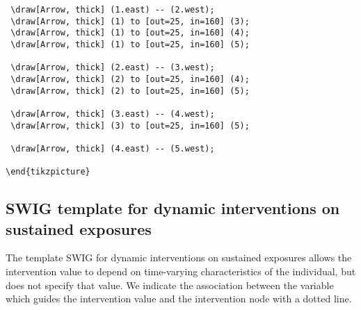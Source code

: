 \documentclass[a4paper]{report}
\begin{document}
\begin{framed}
\begin{Verbatim}
 \draw[Arrow, thick] (1.east) -- (2.west);
 \draw[Arrow, thick] (1) to [out=25, in=160] (3); 
 \draw[Arrow, thick] (1) to [out=25, in=160] (4); 
 \draw[Arrow, thick] (1) to [out=25, in=160] (5); 
 
 \draw[Arrow, thick] (2.east) -- (3.west);
 \draw[Arrow, thick] (2) to [out=25, in=160] (4);
 \draw[Arrow, thick] (2) to [out=25, in=160] (5);

 \draw[Arrow, thick] (3.east) -- (4.west);
 \draw[Arrow, thick] (3) to [out=25, in=160] (5);

 \draw[Arrow, thick] (4.east) -- (5.west); 
 
\end{tikzpicture}

\end{Verbatim}
\end{framed}

\vspace{3mm}

\subsection{SWIG template for dynamic interventions on sustained exposures}

The template SWIG for dynamic interventions on sustained exposures allows the intervention value to depend on time-varying characteristics of the individual, but does not specify that value. We indicate the association between the variable which guides the intervention value and the intervention node with a dotted line.

\vspace{3mm}
\end{document}
